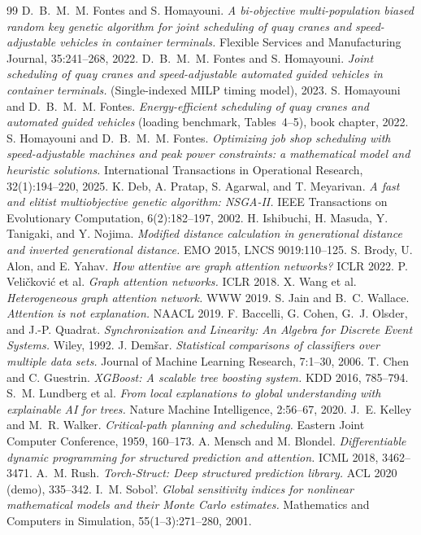 \documentclass[11pt]{article}
\begin{document}
\begin{thebibliography}{99}
\small
{} D.~B.~M.~M. Fontes and S. Homayouni.
\emph{A bi-objective multi-population biased random key genetic algorithm for joint
scheduling of quay cranes and speed-adjustable vehicles in container terminals.}
Flexible Services and Manufacturing Journal, 35:241--268, 2022.
 D.~B.~M.~M. Fontes and S. Homayouni.
\emph{Joint scheduling of quay cranes and speed-adjustable automated guided vehicles in
container terminals.} (Single-indexed MILP timing model), 2023.
 S. Homayouni and D.~B.~M.~M. Fontes.
\emph{Energy-efficient scheduling of quay cranes and automated guided vehicles}
(loading benchmark, Tables~4--5), book chapter, 2022.
 S. Homayouni and D.~B.~M.~M. Fontes.
\emph{Optimizing job shop scheduling with speed-adjustable machines and peak power
constraints: a mathematical model and heuristic solutions.}
International Transactions in Operational Research, 32(1):194--220, 2025.
 K. Deb, A. Pratap, S. Agarwal, and T. Meyarivan.
\emph{A fast and elitist multiobjective genetic algorithm: NSGA-II.}
IEEE Transactions on Evolutionary Computation, 6(2):182--197, 2002.
 H. Ishibuchi, H. Masuda, Y. Tanigaki, and Y. Nojima.
\emph{Modified distance calculation in generational distance and inverted generational
distance.} EMO 2015, LNCS 9019:110--125.
 S. Brody, U. Alon, and E. Yahav.
\emph{How attentive are graph attention networks?} ICLR 2022.
 P. Veli\v{c}kovi\'c et al.
\emph{Graph attention networks.} ICLR 2018.
 X. Wang et al.
\emph{Heterogeneous graph attention network.} WWW 2019.
 S. Jain and B.~C. Wallace.
\emph{Attention is not explanation.} NAACL 2019.
 F. Baccelli, G. Cohen, G.~J. Olsder, and J.-P. Quadrat.
\emph{Synchronization and Linearity: An Algebra for Discrete Event Systems.} Wiley, 1992.
 J. Dem\v{s}ar.
\emph{Statistical comparisons of classifiers over multiple data sets.}
Journal of Machine Learning Research, 7:1--30, 2006.
 T. Chen and C. Guestrin.
\emph{XGBoost: A scalable tree boosting system.} KDD 2016, 785--794.
 S.~M. Lundberg et al.
\emph{From local explanations to global understanding with explainable AI for trees.}
Nature Machine Intelligence, 2:56--67, 2020.
 J.~E. Kelley and M.~R. Walker.
\emph{Critical-path planning and scheduling.} Eastern Joint Computer Conference, 1959,
160--173.
 A. Mensch and M. Blondel.
\emph{Differentiable dynamic programming for structured prediction and attention.}
ICML 2018, 3462--3471.
 A.~M. Rush.
\emph{Torch-Struct: Deep structured prediction library.} ACL 2020 (demo), 335--342.
 I.~M. Sobol'.
\emph{Global sensitivity indices for nonlinear mathematical models and their Monte Carlo
estimates.} Mathematics and Computers in Simulation, 55(1--3):271--280, 2001.
\end{thebibliography}
\end{document}

